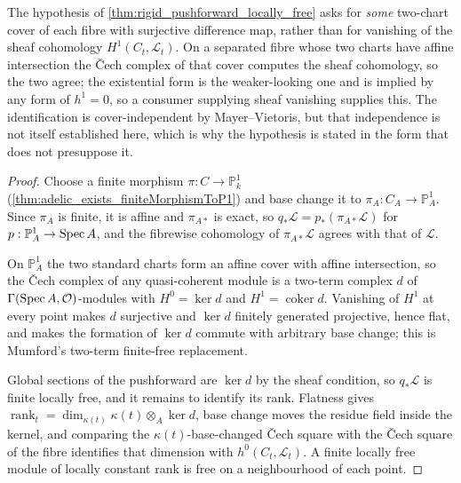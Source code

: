 \begin{remark}
  \label{rem:fiber_h1_vanishing_form}
  The hypothesis of \cref{thm:rigid_pushforward_locally_free} asks for
  \emph{some} two-chart cover of each fibre with surjective difference map,
  rather than for vanishing of the sheaf cohomology \(H^1(C_t, \mathcal{L}_t)\).
  On a separated fibre whose two charts have affine intersection the {\v C}ech
  complex of that cover computes the sheaf cohomology, so the two agree; the
  existential form is the weaker-looking one and is implied by any form of
  \(h^1 = 0\), so a consumer supplying sheaf vanishing supplies this. The
  identification is cover-independent by Mayer--Vietoris, but that
  independence is not itself established here, which is why the hypothesis is
  stated in the form that does not presuppose it.
\end{remark}

\begin{proof}\leanok
  Choose a finite morphism \(\pi : C \to \mathbb{P}^1_k\)
  (\cref{thm:adelic_exists_finiteMorphismToP1}) and base change it to
  \(\pi_A : C_A \to \mathbb{P}^1_A\). Since \(\pi_A\) is finite, it is affine and
  \(\pi_{A*}\) is exact, so \(q_* \mathcal{L} = p_* (\pi_{A*} \mathcal{L})\) for
  \(p : \mathbb{P}^1_A \to \operatorname{Spec} A\), and the fibrewise cohomology of
  \(\pi_{A*}\mathcal{L}\) agrees with that of \(\mathcal{L}\).

  On \(\mathbb{P}^1_A\) the two standard charts form an affine cover with affine
  intersection, so the {\v C}ech complex of any quasi-coherent module is a
  two-term complex \(d\) of \(\Gamma(\operatorname{Spec} A, \mathcal{O})\)-modules with
  \(H^0 = \ker d\) and \(H^1 = \operatorname{coker} d\). Vanishing of \(H^1\) at
  every point makes \(d\) surjective and \(\ker d\) finitely generated
  projective, hence flat, and makes the formation of \(\ker d\) commute with
  arbitrary base change; this is Mumford's two-term finite-free replacement.

  Global sections of the pushforward are \(\ker d\) by the sheaf condition, so
  \(q_* \mathcal{L}\) is finite locally free, and it remains to identify its
  rank. Flatness gives
  \(\operatorname{rank}_t = \dim_{\kappa(t)} \kappa(t) \otimes_A \ker d\), base
  change moves the residue field inside the kernel, and comparing the
  \(\kappa(t)\)-base-changed {\v C}ech square with the {\v C}ech square of the
  fibre identifies that dimension with \(h^0(C_t, \mathcal{L}_t)\). A finite
  locally free module of locally constant rank is free on a neighbourhood of each
  point.
\end{proof}

